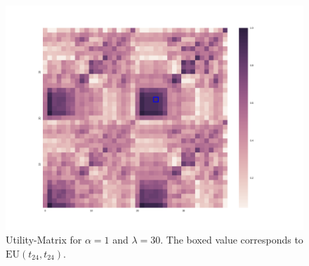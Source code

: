 \documentclass[a4paper]{article}
\begin{document}
\begin{figure}[h!]
  \centering
  \includegraphics[scale=.25]{../code-LOT-extension/u-l30-a1.png} %
  \caption{Utility-Matrix for $\alpha = 1$ and $\lambda = 30$. The boxed value corresponds to $\text{EU}(t_{24},t_{24})$.}
  \label{fig:u-matrix}
\end{figure}
\end{document}
